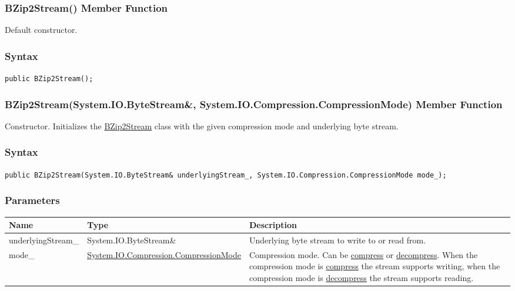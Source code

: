\documentclass[a4paper,oneside,11.000000pt]{book}
\begin{document}
\hypertarget{System.IO.Compression.BZip2Stream.constructor.P.System.IO.Compression.BZip2Stream}{\subsubsection*{BZip2Stream() Member Function}}\begin{flushleft}
Default constructor.

\end{flushleft}
\subsubsection*{Syntax}
\texttt{public BZip2Stream();}
\clearpage

\hypertarget{System.IO.Compression.BZip2Stream.constructor.P.System.IO.Compression.BZip2Stream.R.System.IO.ByteStream.System.IO.Compression.CompressionMode}{\subsubsection*{BZip2Stream(System.IO.ByteStream\&, System.IO.Compression.CompressionMode) Member Function}}
\begin{flushleft}
Constructor. Initializes the \hyperlink{System.IO.Compression.BZip2Stream}{BZip2Stream} class with the given compression mode and underlying byte stream.

\end{flushleft}
\subsubsection*{Syntax}
\texttt{public BZip2Stream(System.IO.ByteStream\& underlyingStream\_, System.IO.Compression.CompressionMode mode\_);}
\subsubsection*{Parameters}
\begin{flushleft}
\begin{supertabular}[l]{!{\raggedright}p{4.10323cm}!{\raggedright}p{5.76344cm}!{\raggedright}p{4.93333cm}}
\textbf{Name}
& \textbf{Type}
& \textbf{Description}
\\
\hline
underlyingStream\_
& System.\-IO.\-ByteStream\&\-
& Underlying byte stream to write to or read from.

\\
mode\_
& \hyperlink{System.IO.Compression.CompressionMode}{System.\-IO.\-Compression.\-CompressionMode}
& Compression mode. Can be \hyperlink{System.IO.Compression.CompressionMode.compress}{compress} or \hyperlink{System.IO.Compression.CompressionMode.decompress}{decompress}.
When the compression mode is \hyperlink{System.IO.Compression.CompressionMode.compress}{compress} the stream supports writing,
when the compression mode is \hyperlink{System.IO.Compression.CompressionMode.decompress}{decompress} the stream supports reading.

\\
\end{supertabular}

\end{flushleft}
\end{document}
